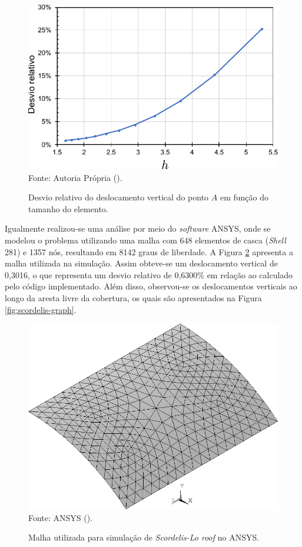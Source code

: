 \begin{figure}[h!]
    \centering
    \caption{Desvio relativo do deslocamento vertical do ponto $A$ em função do tamanho do elemento.}
    \includegraphics[width=0.6\linewidth]{Figuras/scordelis/static-sol.pdf}
    \\Fonte: Autoria Própria (\the\year).
    \label{fig:shell-static-sol}
\end{figure}

Igualmente realizou-se  uma análise por meio do \textit{software} ANSYS, onde se modelou o problema utilizando uma malha com 648 elementos de casca (\textit{Shell} 281) e 1357 nós, resultando em 8142 graus de liberdade. A Figura \ref{fig:scordelisANSYS} apresenta a malha utilizada na simulação. Assim obteve-se um deslocamento vertical de 0,3016, o que representa um desvio relativo de 0,6300\% em relação ao calculado pelo código implementado. Além disso, observou-se os deslocamentos verticais ao longo da aresta livre da cobertura, os quais são apresentados na Figura \ref{fig:scordelis-graph}.

\begin{figure}[h!]
    \centering
    \caption{Malha utilizada para simulação de \textit{Scordelis-Lo roof} no ANSYS.}
    \includegraphics[width=0.45\linewidth]{Figuras/scordelis/ANSYS.png}
    \\Fonte: ANSYS (\the\year).
    \label{fig:scordelisANSYS}
\end{figure}

